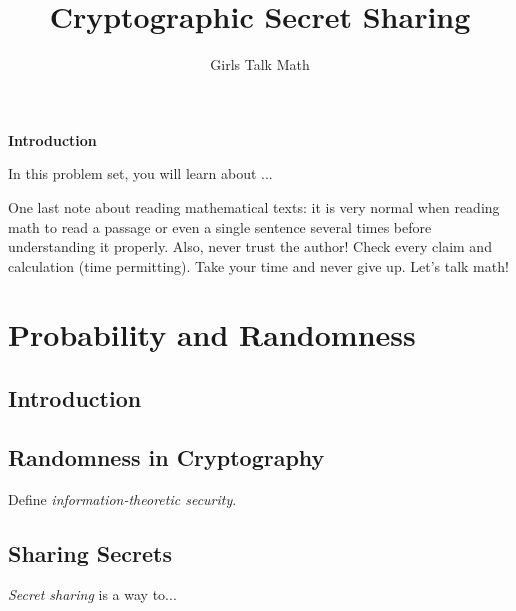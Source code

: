 \documentclass[12 pt]{article}
\title{Cryptographic Secret Sharing}
\author{Girls Talk Math}
\date{}
\newcounter{exercise}[section]
\begin{document}
\maketitle
\vskip 1in
\begin{center} \textbf{Introduction} \end{center}

\indent In this problem set, you will learn about ...
    
    One last note about reading mathematical texts: it is very normal when reading math to read a passage or even a single sentence several times before understanding it properly. Also, never trust the author! Check every claim and calculation (time permitting). Take your time and never give up. Let's talk math!
	
\newpage

\tableofcontents



\newpage


\section{Probability and Randomness}

\subsection{Introduction}

\subsection{Randomness in Cryptography}
Define \emph{information-theoretic security}.

\subsection{Sharing Secrets}
\emph{Secret sharing} is a way to...
\end{document}
